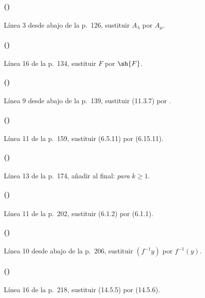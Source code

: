 \paragraph{({\texorpdfstring{\protect{}}{IV, 11.2.9}})}
Línea 3 desde abajo de la p.~126, sustituir $A_\lambda$ por $A_\mu$.

\paragraph{({\texorpdfstring{\protect{}}{IV, 11.3.4}})}
Línea 16 de la p.~134, sustituir $F$ por $\sh{F}$.

\paragraph{({\texorpdfstring{\protect{}}{IV, 11.3.10}})}
Línea 9 desde abajo de la p.~139, sustituir (11.3.7) por
{}.

\paragraph{({\texorpdfstring{\protect{}}{IV, 11.7.5}})}
Línea 11 de la p.~159, sustituir (6.5.11) por (6.15.11).

\paragraph{({\texorpdfstring{\protect{}}{IV, 12.1.1}})}
Línea 13 de la p.~174, añadir al final: \emph{para} $k\geq1$.

\paragraph{({\texorpdfstring{\protect{}}{IV, 14.2.1}})}
Línea 11 de la p.~202, sustituir (6.1.2) por (6.1.1).

\paragraph{({\texorpdfstring{\protect{}}{IV, 14.3.8}})}
Línea 10 desde abajo de la p.~206, sustituir $(f^{-1}y)$ por $f^{-1}(y)$.

\paragraph{({\texorpdfstring{\protect{}}{IV, 14.5.7}})}
Línea 16 de la p.~218, sustituir (14.5.5) por (14.5.6).

